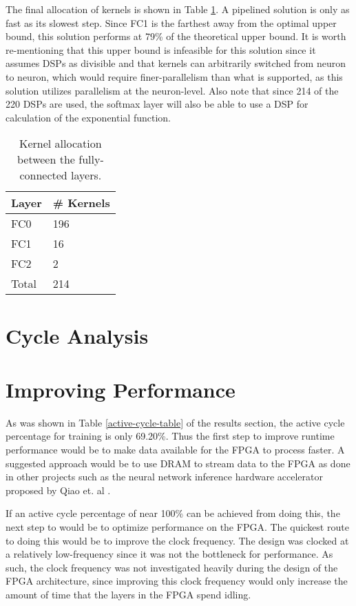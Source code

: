 The final allocation of kernels is shown in Table \ref{dsp-allocat}. A pipelined solution is only as fast as its slowest step. Since FC1 is the farthest away from the optimal upper bound, this solution performs at 79\% of the theoretical upper bound. It is worth re-mentioning that this upper bound is infeasible for this solution since it assumes DSPs as divisible and that kernels can arbitrarily switched from neuron to neuron, which would require finer-parallelism than what is supported, as this solution utilizes parallelism at the neuron-level. Also note that since 214 of the 220 DSPs are used, the softmax layer will also be able to use a DSP for calculation of the exponential function.

\begin{table}
	\centering 
	\begin{tabular}{|l|l|}
		\hline 
		Layer & \# Kernels \\\hline
		FC0 & 196 \\\hline
		FC1 & 16 \\\hline
		FC2 & 2	\\\hline
		Total & 214	\\\hline
	\end{tabular}
	\caption{Kernel allocation between the fully-connected layers.}
	\label{dsp-allocat}
\end{table}

\section{Cycle Analysis}

\section{Improving Performance}
As was shown in Table \ref{active-cycle-table} of the results section, the active cycle percentage for training is only 69.20\%. Thus the first step to improve runtime performance would be to make data available for the FPGA to process faster. A suggested approach would be to use DRAM to stream data to the FPGA as done in other projects such as the neural network inference hardware accelerator proposed by Qiao et. al \cite{qiao}.

If an active cycle percentage of near 100\% can be achieved from doing this, the next step to would be to optimize performance on the FPGA. The quickest route to doing this would be to improve the clock frequency. The design was clocked at a relatively low-frequency since it was not the bottleneck for performance. As such, the clock frequency was not investigated heavily during the design of the FPGA architecture, since improving this clock frequency would only increase the amount of time that the layers in the FPGA spend idling.

